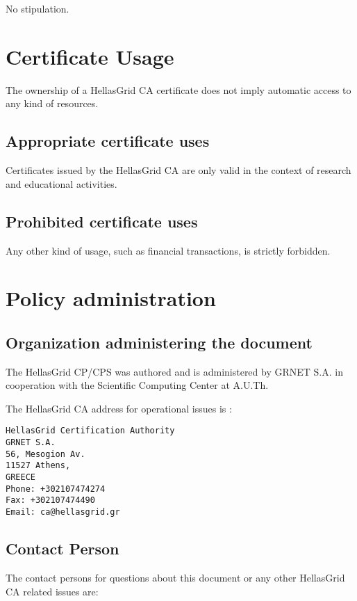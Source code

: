 No stipulation. 

\section{Certificate Usage}

The ownership of a HellasGrid CA certificate does not imply automatic access to any kind of resources.

\subsection{Appropriate certificate uses}

Certificates issued by the HellasGrid CA are only valid in the context of research and educational activities.

\subsection{Prohibited certificate uses}

Any other kind of usage, such as financial transactions, is strictly forbidden.

\section{Policy administration}
\subsection{Organization administering the document}
\label{sub:OrganizationAdministeringTheDocument}

The HellasGrid CP/CPS was authored and is administered by GRNET S.A. in cooperation with the Scientific Computing Center at A.U.Th.

The HellasGrid CA address for operational issues is :

\begin{verbatim}
HellasGrid Certification Authority
GRNET S.A.
56, Mesogion Av.
11527 Athens,
GREECE
Phone: +302107474274
Fax: +302107474490
Email: ca@hellasgrid.gr
\end{verbatim}

\subsection{Contact Person}
\label{sub:ContactPerson}

The contact persons for questions about this document or any other HellasGrid CA related issues are:

